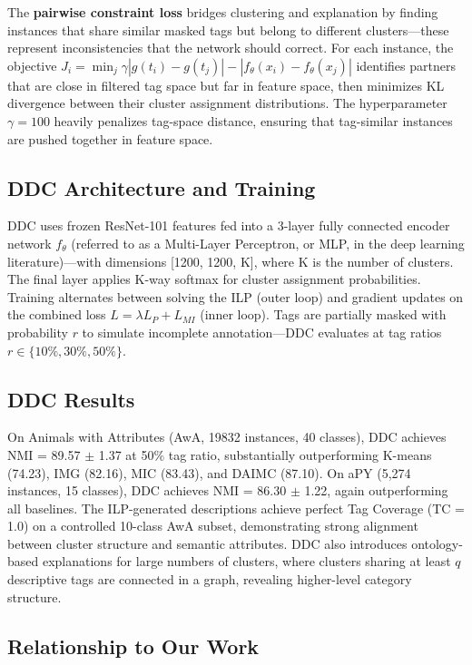 The \textbf{pairwise constraint loss} bridges clustering and explanation by finding instances that share similar masked tags but belong to different clusters---these represent inconsistencies that the network should correct. For each instance, the objective $J_i = \min_j \gamma |g(t_i) - g(t_j)| - |f_\theta(x_i) - f_\theta(x_j)|$ identifies partners that are close in filtered tag space but far in feature space, then minimizes KL divergence between their cluster assignment distributions. The hyperparameter $\gamma = 100$ heavily penalizes tag-space distance, ensuring that tag-similar instances are pushed together in feature space.

\subsection{DDC Architecture and Training}

DDC uses frozen ResNet-101 features fed into a 3-layer fully connected encoder network $f_\theta$ (referred to as a Multi-Layer Perceptron, or MLP, in the deep learning literature)---with dimensions [1200, 1200, K], where K is the number of clusters. The final layer applies K-way softmax for cluster assignment probabilities. Training alternates between solving the ILP (outer loop) and gradient updates on the combined loss $L = \lambda L_P + L_{MI}$ (inner loop). Tags are partially masked with probability $r$ to simulate incomplete annotation---DDC evaluates at tag ratios $r \in \{10\%, 30\%, 50\%\}$.

\subsection{DDC Results}

On Animals with Attributes (AwA, 19832 instances, 40 classes), DDC achieves NMI = 89.57 $\pm$ 1.37 at 50\% tag ratio, substantially outperforming K-means (74.23), IMG (82.16), MIC (83.43), and DAIMC (87.10). On aPY (5,274 instances, 15 classes), DDC achieves NMI = 86.30 $\pm$ 1.22, again outperforming all baselines. The ILP-generated descriptions achieve perfect Tag Coverage (TC = 1.0) on a controlled 10-class AwA subset, demonstrating strong alignment between cluster structure and semantic attributes. DDC also introduces ontology-based explanations for large numbers of clusters, where clusters sharing at least $q$ descriptive tags are connected in a graph, revealing higher-level category structure.

\subsection{Relationship to Our Work}

